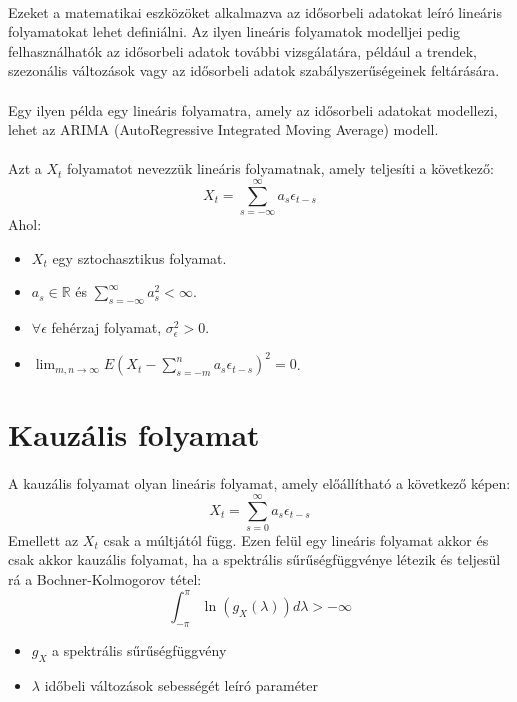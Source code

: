 \documentclass[11pt,a4pape,draftr]{article}
\begin{document}
			\paragraph{}
				Ezeket a matematikai eszközöket alkalmazva az idősorbeli adatokat leíró lineáris folyamatokat lehet definiálni. Az ilyen lineáris folyamatok modelljei pedig felhasználhatók az idősorbeli adatok további vizsgálatára, például a trendek, szezonális változások vagy az idősorbeli adatok szabályszerűségeinek feltárására.
			\paragraph{}
				Egy ilyen példa egy lineáris folyamatra, amely az idősorbeli adatokat modellezi, lehet az ARIMA (AutoRegressive Integrated Moving Average) modell.
			\paragraph{}
				Azt a $X_t$ folyamatot nevezzük lineáris folyamatnak, amely teljesíti a következő:
				$$X_t = \sum_{s= -\infty}^{\infty} a_s \epsilon_{t-s}$$
				Ahol:
				\begin{itemize}
					\item $X_t$ egy sztochasztikus folyamat.
					\item $a_s \in \mathbb{R}$ és $\sum_{s = - \infty}^{\infty} a_s^2 < \infty$.
					\item $\forall \epsilon$ fehérzaj folyamat, $\sigma_\epsilon^2 > 0$.
					\item $\lim_{m,n \to \infty} E \left(X_t - \sum_{s = -m}^n a_s \epsilon_{t-s} \right)^2 = 0$.
				\end{itemize}

			\section{Kauzális folyamat}
				\paragraph{}
					A kauzális folyamat olyan lineáris folyamat, amely előállítható a következő képen:
					$$X_t = \sum_{s=0}^\infty a_s \epsilon_{t-s}$$
					Emellett az $X_t$ csak a múltjától függ. Ezen felül egy lineáris folyamat akkor és csak akkor kauzális folyamat, ha a spektrális sűrűségfüggvénye létezik és teljesül rá a Bochner-Kolmogorov tétel:
					$$\int_{-\pi}^\pi \ln(g_X(\lambda)) d\lambda > -\infty$$
					\begin{itemize}
						\item $g_X$ a spektrális sűrűségfüggvény
						\item $\lambda$ időbeli változások sebességét leíró paraméter
					\end{itemize}
					
\end{document}
